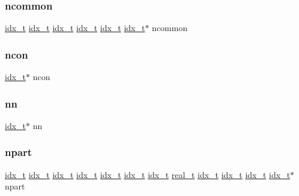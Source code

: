 \subsubsection{\texorpdfstring{ncommon}{ncommon}}
{\footnotesize\ttfamily \hyperlink{a00876_aaa5262be3e700770163401acb0150f52}{idx\+\_\+t} \hyperlink{a00876_aaa5262be3e700770163401acb0150f52}{idx\+\_\+t} \hyperlink{a00876_aaa5262be3e700770163401acb0150f52}{idx\+\_\+t} \hyperlink{a00876_aaa5262be3e700770163401acb0150f52}{idx\+\_\+t} \hyperlink{a00876_aaa5262be3e700770163401acb0150f52}{idx\+\_\+t} \hyperlink{a00876_aaa5262be3e700770163401acb0150f52}{idx\+\_\+t}$\ast$ ncommon}

\mbox{\label{a00879_ac1dd31740e8f97fb57dc917ded30253f}} 
\subsubsection{\texorpdfstring{ncon}{ncon}}
{\footnotesize\ttfamily \hyperlink{a00876_aaa5262be3e700770163401acb0150f52}{idx\+\_\+t}$\ast$ ncon}

\mbox{\label{a00879_a589f5ea2fe3f72f6c632f33cc7fdba7a}} 
\subsubsection{\texorpdfstring{nn}{nn}}
{\footnotesize\ttfamily \hyperlink{a00876_aaa5262be3e700770163401acb0150f52}{idx\+\_\+t}$\ast$ nn}

\mbox{\label{a00879_aa5e2883dfb3577926b3b5842698947bc}} 
\subsubsection{\texorpdfstring{npart}{npart}}
{\footnotesize\ttfamily \hyperlink{a00876_aaa5262be3e700770163401acb0150f52}{idx\+\_\+t} \hyperlink{a00876_aaa5262be3e700770163401acb0150f52}{idx\+\_\+t} \hyperlink{a00876_aaa5262be3e700770163401acb0150f52}{idx\+\_\+t} \hyperlink{a00876_aaa5262be3e700770163401acb0150f52}{idx\+\_\+t} \hyperlink{a00876_aaa5262be3e700770163401acb0150f52}{idx\+\_\+t} \hyperlink{a00876_aaa5262be3e700770163401acb0150f52}{idx\+\_\+t} \hyperlink{a00876_aaa5262be3e700770163401acb0150f52}{idx\+\_\+t} \hyperlink{a00876_a1924a4f6907cc3833213aba1f07fcbe9}{real\+\_\+t} \hyperlink{a00876_aaa5262be3e700770163401acb0150f52}{idx\+\_\+t} \hyperlink{a00876_aaa5262be3e700770163401acb0150f52}{idx\+\_\+t} \hyperlink{a00876_aaa5262be3e700770163401acb0150f52}{idx\+\_\+t} \hyperlink{a00876_aaa5262be3e700770163401acb0150f52}{idx\+\_\+t}$\ast$ npart}


